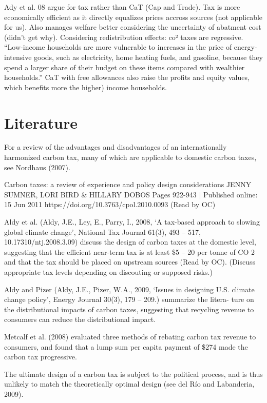 \documentclass[version=3.21, pagesize, twoside=off, bibliography=totoc, DIV=calc, fontsize=12pt, a4paper, french, english]{scrartcl}
\begin{document}
Ady et al. 08 argue for tax rather than CaT (Cap and Trade). Tax is more economically efficient as it directly equalizes prices accross sources (not applicable for us). Also manages welfare better considering the uncertainty of abatment cost (didn’t get why). Considering redistribution effects: co² taxes are regressive. “Low-income households are more vulnerable to increases in the price of energy-intensive
goods, such as electricity, home heating fuels, and gasoline, because they spend a larger share of
their budget on these items compared with wealthier households.” CaT with free allowances also raise the profits and equity values, which benefits more the higher) income households.

\section{Literature}
For a review of
the advantages and disadvantages of an internationally harmonized carbon tax, many of which are
applicable to domestic carbon taxes, see Nordhaus (2007).

Carbon taxes: a review of experience and policy design considerations JENNY SUMNER, LORI BIRD \& HILLARY DOBOS Pages 922-943 | Published online: 15 Jun 2011 https://doi.org/10.3763/cpol.2010.0093 (Read by OC)

Aldy et al. (Aldy, J.E., Ley, E., Parry, I., 2008, ‘A tax-based approach to slowing global climate change’, National Tax Journal 61(3),
493 – 517, 10.17310/ntj.2008.3.09) discuss the design of carbon taxes
at the domestic level, suggesting that the efficient near-term tax is at least \$5 – 20 per tonne of CO 2 and
that the tax should be placed on upstream sources (Read by OC). (Discuss appropriate tax levels depending on discouting or supposed risks.)
 
Aldy and Pizer (Aldy, J.E., Pizer, W.A., 2009, ‘Issues in designing U.S. climate change policy’, Energy Journal 30(3), 179 – 209.) summarize the litera-
ture on the distributional impacts of carbon taxes, suggesting that recycling revenue to consumers can
reduce the distributional impact.

Metcalf et al. (2008) evaluated three methods of rebating
carbon tax revenue to consumers, and found that a lump sum per capita payment of \$274 made the
carbon tax progressive.

The ultimate design of a carbon tax is subject to the political process, and is thus unlikely to match the theoretically optimal design (see del Río and Labanderia, 2009).
\end{document}
